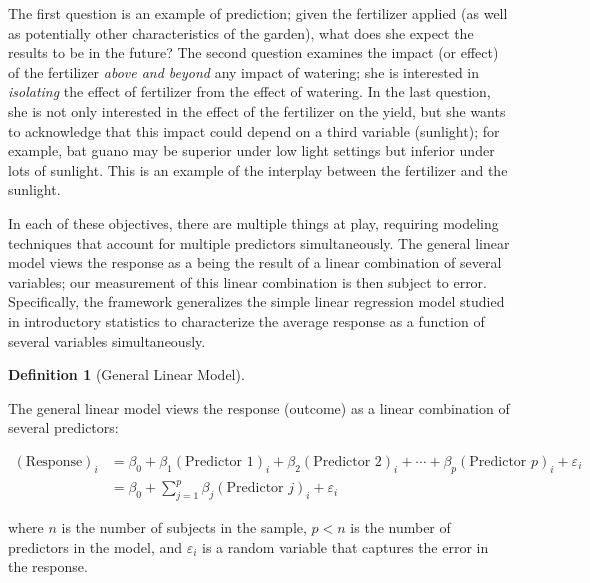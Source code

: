 \documentclass[
  letterpaper,
  DIV=11,
  numbers=noendperiod]{scrreprt}
\theoremstyle{definition}
\newtheorem{definition}{Definition}[chapter]
\theoremstyle{definition}
\theoremstyle{remark}
\begin{document}
The first question is an example of prediction; given the fertilizer
applied (as well as potentially other characteristics of the garden),
what does she expect the results to be in the future? The second
question examines the impact (or effect) of the fertilizer \emph{above
and beyond} any impact of watering; she is interested in
\emph{isolating} the effect of fertilizer from the effect of watering.
In the last question, she is not only interested in the effect of the
fertilizer on the yield, but she wants to acknowledge that this impact
could depend on a third variable (sunlight); for example, bat guano may
be superior under low light settings but inferior under lots of
sunlight. This is an example of the interplay between the fertilizer and
the sunlight.

In each of these objectives, there are multiple things at play,
requiring modeling techniques that account for multiple predictors
simultaneously. The general linear model views the response as a being
the result of a linear combination of several variables; our measurement
of this linear combination is then subject to error. Specifically, the
framework generalizes the simple linear regression model studied in
introductory statistics to characterize the average response as a
function of several variables simultaneously.

\begin{definition}[General Linear
Model]\protect\hypertarget{def-general-linear-model}{}\label{def-general-linear-model}

The general linear model views the response (outcome) as a linear
combination of several predictors:

\[
\begin{aligned}
  (\text{Response})_i 
    &= \beta_0 + \beta_1 (\text{Predictor 1})_{i} + \beta_2 (\text{Predictor 2})_{i} + \dotsb + 
      \beta_p (\text{Predictor } p)_{i} + \varepsilon_i \\
    &= \beta_0 + \sum\limits_{j=1}^{p} \beta_j (\text{Predictor } j)_{i} + \varepsilon_i
\end{aligned}
\]

where \(n\) is the number of subjects in the sample, \(p < n\) is the
number of predictors in the model, and \(\varepsilon_i\) is a random
variable that captures the error in the response.

\end{definition}
\end{document}
